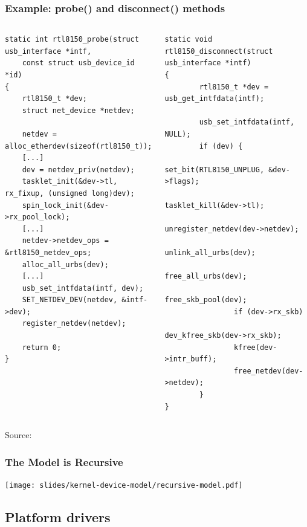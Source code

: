 \begin{frame}[fragile]
\frametitle{Example: probe() and disconnect() methods}
\begin{columns}
    \begin{block}{}
    \begin{verbatim}
static int rtl8150_probe(struct usb_interface *intf,
    const struct usb_device_id *id)
{
    rtl8150_t *dev;
    struct net_device *netdev;

    netdev = alloc_etherdev(sizeof(rtl8150_t));
    [...]
    dev = netdev_priv(netdev);
    tasklet_init(&dev->tl, rx_fixup, (unsigned long)dev);
    spin_lock_init(&dev->rx_pool_lock);
    [...]
    netdev->netdev_ops = &rtl8150_netdev_ops;
    alloc_all_urbs(dev);
    [...]
    usb_set_intfdata(intf, dev);
    SET_NETDEV_DEV(netdev, &intf->dev);
    register_netdev(netdev);

    return 0;
}
    \end{verbatim}
    \end{block}
    \begin{block}{}
    \begin{verbatim}
static void rtl8150_disconnect(struct usb_interface *intf)
{
        rtl8150_t *dev = usb_get_intfdata(intf);

        usb_set_intfdata(intf, NULL);
        if (dev) {
                set_bit(RTL8150_UNPLUG, &dev->flags);
                tasklet_kill(&dev->tl);
                unregister_netdev(dev->netdev);
                unlink_all_urbs(dev);
                free_all_urbs(dev);
                free_skb_pool(dev);
                if (dev->rx_skb)
                        dev_kfree_skb(dev->rx_skb);
                kfree(dev->intr_buff);
                free_netdev(dev->netdev);
        }
}
    \end{verbatim}
    \end{block}
\end{columns}
\vfill
Source: 
\end{frame}

\begin{frame}
  \frametitle{The Model is Recursive}
  \begin{center}
    \texttt{[image: slides/kernel-device-model/recursive-model.pdf]}
  \end{center}
\end{frame}

\subsection{Platform drivers}

